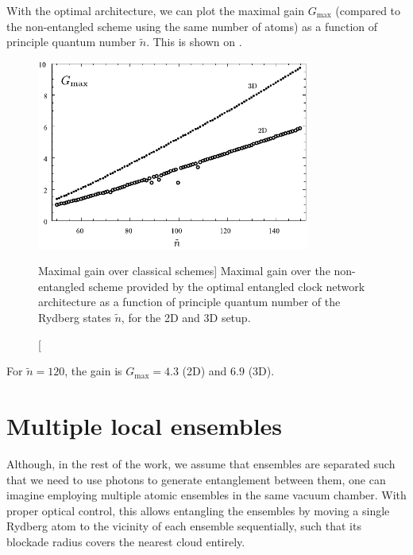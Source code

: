 With the optimal architecture, we can plot the maximal gain $G_\mathrm{max}$
(compared to the non-entangled scheme using the same number of atoms) as a
function of principle quantum number $\tilde n$.
This is shown on .
\begin{figure}[h]
\centering
\includegraphics[width=0.8\textwidth]{./figs_Komar2015/gain_2d3d.pdf}
\caption
[Maximal gain over classical schemes]
{
\label{fig:gain}
Maximal gain over the non-entangled scheme provided by the optimal entangled
clock network architecture as a function of principle quantum number of the
Rydberg states $\tilde n$, for the 2D and 3D setup.}
\end{figure}
For $\tilde n = 120$, the gain is $G_\mathrm{max} = 4.3$ (2D) and $6.9$ (3D).


\section{Multiple local ensembles}
\label{app:Multiple_local_ensembles}
Although, in the rest of the work, we assume that ensembles are separated such
that we need to use photons to generate entanglement between them, one can
imagine employing multiple atomic ensembles in the same vacuum chamber. With
proper optical control, this allows entangling the ensembles by moving a single
Rydberg atom to the vicinity of each ensemble sequentially, such that its
blockade radius covers the nearest cloud entirely.

